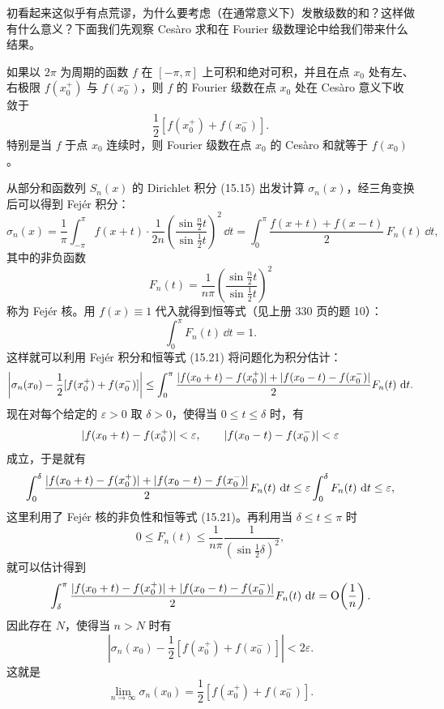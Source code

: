 初看起来这似乎有点荒谬，为什么要考虑（在通常意义下）发散级数的和？这样做有什么意义？下面我们先观察 Cesàro 求和在 Fourier 级数理论中给我们带来什么结果。

\begin{xproposition}[15.2.1（Fejér 定理）]
如果以 $2\pi$ 为周期的函数 $f$ 在 $[-\pi,\pi]$ 上可积和绝对可积，并且在点 $x_0$ 处有左、右极限 $f(x_0^+)$ 与 $f(x_0^-)$，则 $f$ 的 Fourier 级数在点 $x_0$ 处在 Cesàro 意义下收敛于
\[
  \frac12[f(x_0^+)+f(x_0^-)].
\]
特别是当 $f$ 于点 $x_0$ 连续时，则 Fourier 级数在点 $x_0$ 的 Cesàro 和就等于 $f(x_0)$。
\end{xproposition}

\begin{xproof}
从部分和函数列 $S_n(x)$ 的 Dirichlet 积分 (15.15) 出发计算 $\sigma_n(x)$，经三角变换后可以得到 Fejér 积分：
\[
  \sigma_n(x)=\frac1\pi\int_{-\pi}^{\pi}f(x+t)\cdot\frac1{2n}
  \left(\frac{\sin\frac n2t}{\sin\frac12t}\right)^2\,\dd t
  =\int_0^{\pi}\frac{f(x+t)+f(x-t)}2\,F_n(t)\,\dd t,
\]
其中的非负函数
\begin{equation}
  F_n(t)=\frac1{n\pi}\left(\frac{\sin\frac n2t}{\sin\frac12t}\right)^2
  \tag{15.20}
  \label{eq:15.20}
\end{equation}
称为 Fejér 核。用 $f(x)\equiv1$ 代入就得到恒等式（见上册 330 页的题 10）：
\begin{equation}
  \int_0^{\pi}F_n(t)\,\dd t=1.
  \tag{15.21}
  \label{eq:15.21}
\end{equation}
这样就可以利用 Fejér 积分和恒等式 (15.21) 将问题化为积分估计：
\[
  \left|\sigma_n(x_0)-\frac12[f(x_0^+)+f(x_0^-)]\right|
  \le\int_0^{\pi}
  \frac{\lvert f(x_0+t)-f(x_0^+)\rvert+\lvert f(x_0-t)-f(x_0^-)\rvert}2F_n(t)\,\mathop{}\!\mathrm{d} t.
\]
现在对每个给定的 $\varepsilon>0$ 取 $\delta>0$，使得当 $0\le t\le\delta$ 时，有
\[
  \lvert f(x_0+t)-f(x_0^+)\rvert<\varepsilon,
  \qquad
  \lvert f(x_0-t)-f(x_0^-)\rvert<\varepsilon
\]
成立，于是就有
\[
  \int_0^{\delta}
  \frac{\lvert f(x_0+t)-f(x_0^+)\rvert+\lvert f(x_0-t)-f(x_0^-)\rvert}2F_n(t)\,\mathop{}\!\mathrm{d} t
  \le\varepsilon\int_0^{\delta}F_n(t)\,\mathop{}\!\mathrm{d} t\le\varepsilon,
\]
这里利用了 Fejér 核的非负性和恒等式 (15.21)。再利用当 $\delta\le t\le\pi$ 时
\[
  0\le F_n(t)\le\frac1{n\pi}\frac1{(\sin\frac12\delta)^2},
\]
就可以估计得到
\[
  \int_{\delta}^{\pi}
  \frac{\lvert f(x_0+t)-f(x_0^+)\rvert+\lvert f(x_0-t)-f(x_0^-)\rvert}2F_n(t)\,\mathop{}\!\mathrm{d} t
  =\mathrm{O}\!\left(\frac1n\right).
\]
因此存在 $N$，使得当 $n>N$ 时有
\[
  \left|\sigma_n(x_0)-\frac12[f(x_0^+)+f(x_0^-)]\right|<2\varepsilon.
\]
这就是
\[
  \lim_{n\to\infty}\sigma_n(x_0)=\frac12[f(x_0^+)+f(x_0^-)].
\]
\end{xproof}

